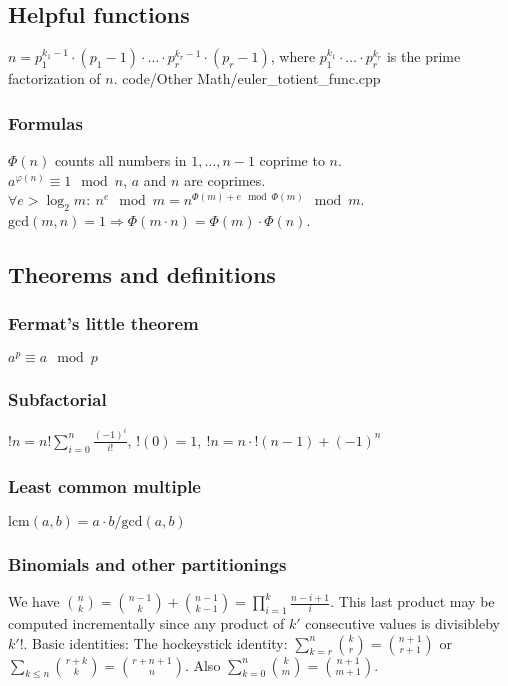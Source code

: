 \documentclass[
	a4paper,
	landscape,
	10pt,
]{article}
\begin{document}
	\subsection{Helpful functions}
		{
			$n = p_1^{k_1-1}\cdot(p_1-1) \cdot \hdots \cdot p_r^{k_r-1}\cdot(p_r-1)$, where $p_1^{k_1} \cdot \hdots \cdot p_r^{k_r}$ is the prime factorization of $n$.
		}
		{code/Other Math/euler_totient_func.cpp}
		\subsubsection*{Formulas}
			$\Phi(n)$ counts all numbers in ${1,\hdots,n-1}$ coprime to $n$. \\
			$a^{\varphi (n)} \equiv 1 \mod n$, $a$ and $n$ are coprimes. \\
			$\forall e > \log_2 m:~ n^e \mod m = n^{\Phi(m) + e \mod \Phi(m)} \mod m$. \\
			$\text{gcd}(m,n) = 1 \Rightarrow \Phi(m\cdot n) = \Phi(m) \cdot \Phi(n)$. \\

	\subsection{Theorems and definitions}
		\subsubsection*{Fermat's little theorem}
		$a^p \equiv a \mod p$
		\subsubsection*{Subfactorial}
		$!n = n! \sum_{i=0}^{n} \frac{(-1)^i}{i!}$, 
		$!(0) = 1, ~ !n = n \cdot !(n-1) + (-1)^n$
		\subsubsection*{Least common multiple}
		$\text{lcm}(a, b) = a \cdot b / \text{gcd}(a, b)$

		\subsubsection*{Binomials and other partitionings}
		We have $\binom{n}{k} = \binom{n-1}{k}+\binom{n-1}{k-1} =
			\prod_{i=1}^k \frac{n-i+1}{i}$. This last product may be computed
		incrementally since any product of $k'$ consecutive values is divisibleby
		$k'!$.
		Basic identities: The hockeystick identity: $\sum_{k=r}^n \binom{k}{r}
			= \binom{n+1}{r+1}$
		or $\sum_{k\leq n}\binom{r+k}{k} = \binom{r+n+1}{n}$.
		Also $\sum_{k=0}^n \binom{k}{m} = \binom{n+1}{m+1}$.
\end{document}
